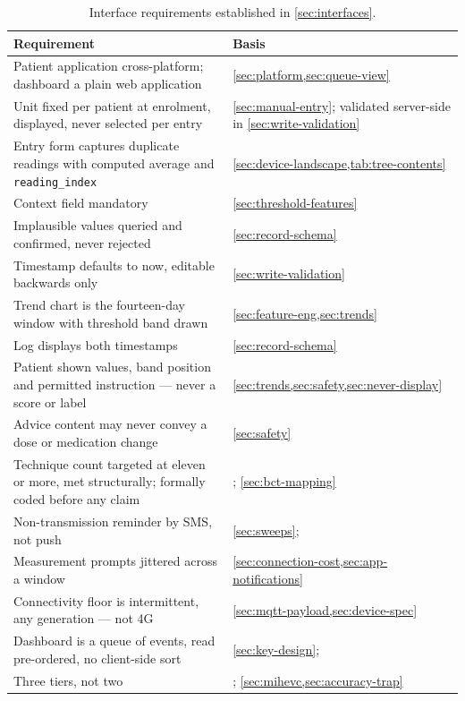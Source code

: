 \documentclass[12pt,a4paper,oneside]{report}
\begin{document}
\begin{table}[htbp]
\centering\footnotesize
\caption{Interface requirements established in \cref{sec:interfaces}.}\label{tab:spec44}
\begin{tabularx}{\textwidth}{@{}X >{\raggedright\arraybackslash}p{4.8cm}@{}}
\toprule
\textbf{Requirement} & \textbf{Basis} \\
\midrule
Patient application cross-platform; dashboard a plain web application & \cref{sec:platform,sec:queue-view} \\
Unit fixed per patient at enrolment, displayed, never selected per entry & \cref{sec:manual-entry}; validated server-side in \cref{sec:write-validation} \\
Entry form captures duplicate readings with computed average and \texttt{reading\_index} & \cref{sec:device-landscape,tab:tree-contents} \\
Context field mandatory & \cref{sec:threshold-features} \\
Implausible values queried and confirmed, never rejected & \cref{sec:record-schema} \\
Timestamp defaults to now, editable backwards only & \cref{sec:write-validation} \\
Trend chart is the fourteen-day window with threshold band drawn & \cref{sec:feature-eng,sec:trends} \\
Log displays both timestamps & \cref{sec:record-schema} \\
Patient shown values, band position and permitted instruction --- never a score or label & \cref{sec:trends,sec:safety,sec:never-display} \\
Advice content may never convey a dose or medication change & \cref{sec:safety} \\
Technique count targeted at eleven or more, met structurally; formally coded before any claim & \textcite{zhou2024}; \cref{sec:bct-mapping} \\
Non-transmission reminder by SMS, not push & \cref{sec:sweeps}; \textcite{yazdani2018} \\
Measurement prompts jittered across a window & \cref{sec:connection-cost,sec:app-notifications} \\
Connectivity floor is intermittent, any generation --- not 4G & \cref{sec:mqtt-payload,sec:device-spec} \\
Dashboard is a queue of events, read pre-ordered, no client-side sort & \cref{sec:key-design}; \textcite{yazdani2018} \\
Three tiers, not two & \textcite{mihevc2025}; \cref{sec:mihevc,sec:accuracy-trap} \\

\end{tabularx}
\end{table}
\end{document}
